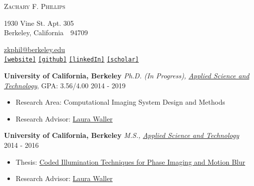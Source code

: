 \documentclass[12pt,letterpaper]{article}
\makeatletter
\def\myemail{zkphil@berkeley.edu}
\def\myweb{https://www.ocf.berkeley.edu/~zfphil/}
\def\mygithub{https://github.com/zfphil}
\newcommand{\mhead}[1]{\leavevmode\marginpar{\sffamily\footnotesize #1}}
\newcommand{\rdate}[1]{{} \hfill #1}
\def\hrulefill{\leavevmode\leaders \hrule height \rulethickness \hfill\kern\z@}
\makeatother
\begin{document}
\flushbottom
\pagestyle{fancy} \setlength\headwidth{6.5in}
 \cfoot{}
\thispagestyle{empty}
\begin{adjustwidth}{-1in}{}
{\Huge
  {\textsc{%
Zachary F.
Phillips}
  }
}
\hfill\hfill\hfill
{
  \begin{minipage}[b]{2in}
    \flushleft \footnotesize
    1930 Vine St. Apt. 305 \\
    Berkeley, California~~94709
  \end{minipage}
  \hfill
  \begin{minipage}[b]{2in}
    \flushright \footnotesize
    \href{mailto:\myemail}{\myemail} \\
    \href{\myweb}{\texttt{[website]}}
    \href{\mygithub}{\texttt{[github]}}
    \href{https://www.linkedin.com/pub/zack-phillips/49/889/b28}{\texttt{[linkedIn]}}
    \href{https://scholar.google.com/citations?user=yRsMPdkAAAAJ&hl=en&authuser=1}{\texttt{[scholar]}}
  \end{minipage}
}\par
\end{adjustwidth}
\reversemarginpar
\setlength\marginparwidth{0.85in}

\medskip
\mhead{Education}%
\textbf{University of California, Berkeley} \newline
\emph{Ph.D. (In Progress), \href{http://ast.coe.berkeley.edu/}{Applied Science and Technology}}, GPA: 3.56/4.00  \rdate{2014 - 2019}
\begin{itemize}
  \item Research Area: Computational Imaging System Design and Methods
  \item Research Advisor: \href{http://www.laurawaller.com}{Laura Waller}
\end{itemize}

\textbf{University of California, Berkeley} \newline
\emph{M.S., \href{http://ast.coe.berkeley.edu/}{Applied Science and Technology}} \rdate{2014 - 2016}
\begin{itemize}
  \item Thesis: \href{https://www.dropbox.com/s/emnxog3kvvpphvy/Phillips_mastersThesis_submitted.pdf?dl=0}{Coded Illumination Techniques for Phase Imaging and Motion Blur}
  \item Research Advisor: \href{http://www.laurawaller.com}{Laura Waller}

\end{itemize}
\end{document}

